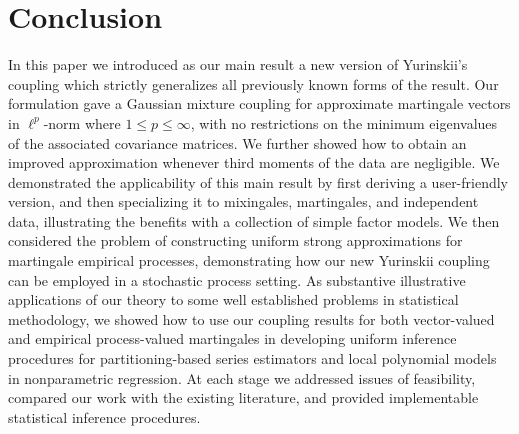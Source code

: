 \section{Conclusion}
\label{sec:conclusion}

In this paper we introduced as our main result a new version of Yurinskii's
coupling which strictly generalizes all previously known forms of the result.
Our formulation gave a Gaussian mixture coupling for approximate martingale
vectors in $\ell^p$-norm where $1 \leq p \leq \infty$, with no restrictions on
the minimum eigenvalues of the associated covariance matrices. We further
showed how to obtain an improved approximation whenever third moments of the
data are negligible. We demonstrated the applicability of this main result by
first deriving a user-friendly version, and then specializing it to mixingales,
martingales, and independent data, illustrating the benefits with a collection
of simple factor models. We then considered the problem of constructing uniform
strong approximations for martingale empirical processes, demonstrating how our
new Yurinskii coupling can be employed in a stochastic process setting. As
substantive illustrative applications of our theory to some
well established %
problems in statistical methodology, we showed how to use our coupling results
for both vector-valued and empirical process-valued martingales in developing
uniform inference procedures for partitioning-based series estimators and local
polynomial models in nonparametric regression.
At each stage we addressed issues of feasibility, compared our work with the
existing literature, and provided implementable statistical inference
procedures.

